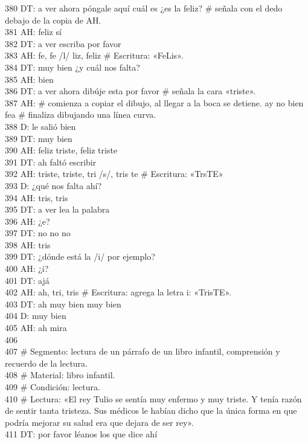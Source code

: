 380 DT: a ver ahora póngale aquí cuál es ¿es la feliz? \# señala con el dedo debajo de la copia de AH.\\
381 AH: feliz sí\\
382 DT: a ver escriba por favor\\
383 AH: fe, fe /l/ liz, feliz \# Escritura: «FeLis».\\
384 DT: muy bien ¿y cuál nos falta?\\
385 AH: bien\\
386 DT: a ver ahora dibúje esta por favor \# señala la cara «triste».\\
387 AH: \# comienza a copiar el dibujo, al llegar a la boca se detiene. ay no bien fea \# finaliza dibujando una línea curva.\\
388 D: le salió bien\\
389 DT: muy bien\\
390 AH: feliz triste, feliz triste\\
391 DT: ah faltó escribir\\
392 AH: triste, triste, tri /s/, tris te \# Escritura: «TrsTE»\\
393 D: ¿qué nos falta ahí?\\
394 AH: tris, tris\\
395 DT: a ver lea la palabra\\
396 AH: ¿e?\\
397 DT: no no no\\
398 AH: tris\\
399 DT: ¿dónde está la /i/ por ejemplo?\\
400 AH: ¿i?\\
401 DT: ajá\\
402 AH: ah, tri, tris \# Escritura: agrega la letra i: «TrisTE».\\
403 DT: ah muy bien muy bien\\
404 D: muy bien\\
405 AH: ah mira\\
406 \\
407 \# Segmento: lectura de un párrafo de un libro infantil, comprensión y recuerdo de la lectura.\\
408 \# Material: libro infantil.\\
409 \# Condición: lectura.\\
410 \# Lectura: «El rey Tulio se sentía muy enfermo y muy triste. Y tenía razón de sentir tanta tristeza. Sus médicos le habían dicho que la única forma en que podría mejorar su salud era que dejara de ser rey».\\
411 DT: por favor léanos los que dice ahí\\
